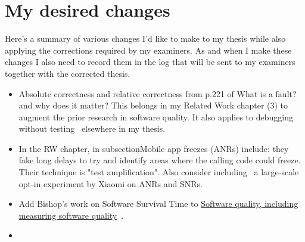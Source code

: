 \section{My desired changes}
Here's a summary of various changes I'd like to make to my thesis while also  applying the corrections required by my examiners. As and when I make these changes I also need to record them in the log that will be sent to my examiners together with the corrected thesis.

\begin{itemize}
    \item Absolute correctness and relative correctness from p.221 of What is a fault? and why does it matter?\cite{diallo2017_what_is_a_fault_why_does_it_matter} This belongs in my Related Work chapter (3) to augment the prior research in software quality. It also applies to debugging without testing~\cite{ghardallou2016debugging_without_testing} elsewhere in my thesis.
    \item In the RW chapter, in subsection{Mobile app freezes (ANRs)} include: \cite{yang2013testing} they fake long delays to try and identify areas where the calling code could freeze. Their technique is "test amplification". Also consider including~\cite{li2020_experience_or_aging_why_does_android_stop_responding_and_what_can_we_do_about_it} a large-scale opt-in experiment by Xiaomi on ANRs and SNRs.
    \item Add Bishop's work on Software Survival Time to \href{rw-software-quality-including-measurement-topic}{Software quality, including measuring software quality}~\cite{bishop1993variation}.
    \item 
\end{itemize}
